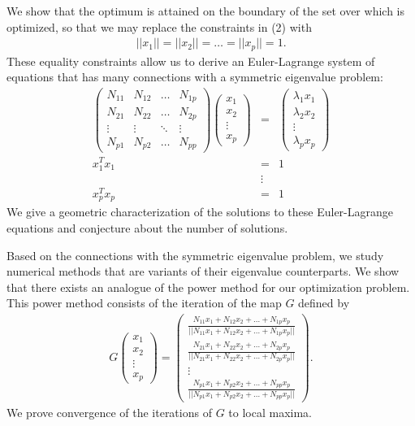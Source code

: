 \documentclass{report}
\begin{document}
We show that the optimum is attained on the boundary of the set over which
is optimized, so that we may replace the constraints in (2) with
\begin{eqnarray}
||x_1||=||x_2||=\hdots=||x_p||=1.
\end{eqnarray}
These equality constraints allow us to derive an Euler-Lagrange system of
equations that has many connections with a symmetric eigenvalue problem:
\begin{eqnarray*}
\left ( \begin{array}{cccc} N_{11} & N_{12} & \hdots & N_{1p} \\
N_{21} & N_{22} & \hdots & N_{2p} \\
\vdots & \vdots & \ddots & \vdots \\
N_{p1} & N_{p2} & \hdots & N_{pp} \end{array} \right )
\left ( \begin{array}{c} x_1 \\ x_2 \\ \vdots \\ x_p \end{array} \right )&=&
\left ( \begin{array}{c} \lambda_1 x_1 \\ \lambda_2 x_2 \\ \vdots \\
\lambda_p x_p \end{array} \right ) \\
x_1^Tx_1&=&1 \\
&\vdots& \\
x_p^Tx_p&=&1
\end{eqnarray*}
We give a geometric characterization of the solutions to these
Euler-Lagrange equations and conjecture about the number
of solutions.

Based on the connections with the symmetric eigenvalue problem,
we study numerical methods that are variants of their eigenvalue
counterparts. We show that there exists an analogue of the power method
for our optimization problem. This power method consists of the iteration
of the map $G$ defined by
\begin{eqnarray}
G\left ( \begin{array}{c} x_1 \\ x_2 \\ \vdots \\ x_p \end{array} \right )
=\left ( \begin{array}{c} \frac{N_{11}x_1+N_{12}x_2+ \hdots +N_{1p}x_p}
{||N_{11}x_1+N_{12}x_2+ \hdots +N_{1p}x_p||} \\
\frac{N_{21}x_1+N_{22}x_2+ \hdots +N_{2p}x_p}
{||N_{21}x_1+N_{22}x_2+ \hdots +N_{2p}x_p||} \\
\vdots \\
\frac{N_{p1}x_1+N_{p2}x_2+ \hdots +N_{pp}x_p}
{||N_{p1}x_1+N_{p2}x_2+ \hdots +N_{pp}x_p||}
\end{array} \right ).
\end{eqnarray}
We prove convergence of the iterations of $G$ to local maxima.
\end{document}
